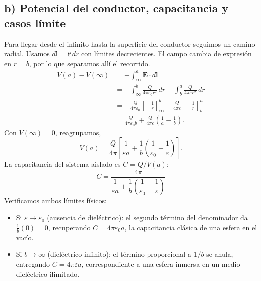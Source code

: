 \documentclass[11pt]{article}
\begin{document}
\subsection*{b) Potencial del conductor, capacitancia y casos límite}
Para llegar desde el infinito hasta la superficie del conductor
seguimos un camino radial. Usamos $d\mathbf l=\hat{\mathbf r}\,dr$
con límites decrecientes. El campo cambia de expresión en $r=b$,
por lo que separamos allí el recorrido.
\begin{align*}
    V(a)-V(\infty)
    &=-\int_\infty^a\mathbf E\cdot d\mathbf l\\
    &=-\int_\infty^b \frac{Q}{4\pi\varepsilon_0 r^2}\,dr
      -\int_b^a \frac{Q}{4\pi\varepsilon r^2}\,dr\\
    &=-\frac{Q}{4\pi\varepsilon_0}
      \left[-\frac1r\right]_\infty^b
      -\frac{Q}{4\pi\varepsilon}
      \left[-\frac1r\right]_b^a\\
    &=\frac{Q}{4\pi\varepsilon_0 b}
      +\frac{Q}{4\pi\varepsilon}\left(\frac1a-\frac1b\right).
\end{align*}
Con $V(\infty)=0$, reagrupamos,
\[
    V(a)=\frac{Q}{4\pi}
      \left[\frac{1}{\varepsilon a}
        +\frac1b\left(\frac1{\varepsilon_0}-\frac1\varepsilon\right)\right].
\]
La capacitancia del sistema aislado es $C = Q / V(a)$:
\begin{equation}
    C = \frac{4\pi}{\dfrac{1}{\varepsilon a} + \dfrac{1}{b}\left( \dfrac{1}{\varepsilon_0} - \dfrac{1}{\varepsilon} \right)}
\end{equation}
Verificamos ambos límites físicos:
\begin{itemize}
    \item Si $\varepsilon \to \varepsilon_0$ (ausencia de dieléctrico): el segundo término del denominador da $\frac{1}{b}(0) = 0$, recuperando $C = 4\pi \varepsilon_0 a$, la capacitancia clásica de una esfera en el vacío.
    \item Si $b \to \infty$ (dieléctrico infinito): el término proporcional a $1/b$ se anula, entregando $C = 4\pi \varepsilon a$, correspondiente a una esfera inmersa en un medio dieléctrico ilimitado.
\end{itemize}
\end{document}
